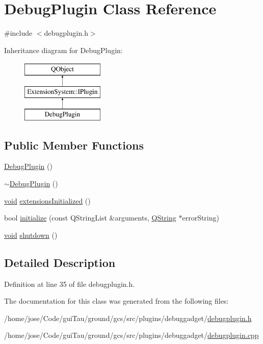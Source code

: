 \hypertarget{class_debug_plugin}{\section{Debug\-Plugin Class Reference}
\label{class_debug_plugin}
}


{\ttfamily \#include $<$debugplugin.\-h$>$}

Inheritance diagram for Debug\-Plugin\-:\begin{figure}[H]
\begin{center}
\leavevmode
\includegraphics[height=3.000000cm]{class_debug_plugin}
\end{center}
\end{figure}
\subsection*{Public Member Functions}
\begin{DoxyCompactItemize}
\item 
\hyperlink{group___debug_gadget_plugin_ga20c99d3ead7ff85b7fedc4e18a1e9a8b}{Debug\-Plugin} ()
\item 
\hyperlink{group___debug_gadget_plugin_gaf353390f1494d9cb3baaa804e8805854}{$\sim$\-Debug\-Plugin} ()
\item 
\hyperlink{group___u_a_v_objects_plugin_ga444cf2ff3f0ecbe028adce838d373f5c}{void} \hyperlink{group___debug_gadget_plugin_ga33da71812af948fb7295673fedc11e76}{extensions\-Initialized} ()
\item 
bool \hyperlink{group___debug_gadget_plugin_gac924db212f19bc55d62f1a821a234437}{initialize} (const Q\-String\-List \&arguments, \hyperlink{group___u_a_v_objects_plugin_gab9d252f49c333c94a72f97ce3105a32d}{Q\-String} $\ast$error\-String)
\item 
\hyperlink{group___u_a_v_objects_plugin_ga444cf2ff3f0ecbe028adce838d373f5c}{void} \hyperlink{group___debug_gadget_plugin_ga7239f7418bd69dfa8977fc1015656370}{shutdown} ()
\end{DoxyCompactItemize}


\subsection{Detailed Description}


Definition at line 35 of file debugplugin.\-h.



The documentation for this class was generated from the following files\-:\begin{DoxyCompactItemize}
\item 
/home/jose/\-Code/gui\-Tau/ground/gcs/src/plugins/debuggadget/\hyperlink{debugplugin_8h}{debugplugin.\-h}\item 
/home/jose/\-Code/gui\-Tau/ground/gcs/src/plugins/debuggadget/\hyperlink{debugplugin_8cpp}{debugplugin.\-cpp}\end{DoxyCompactItemize}
